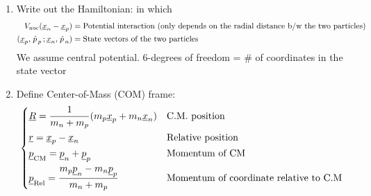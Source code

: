\documentclass{school-22.101-notes}
\begin{document}
\begin{enumerate}
\item Write out the Hamiltonian: 
in which 
\begin{align}
 V_{\mathrm{nuc}} (\underline{x}_n - \underline{x}_p ) &= \mbox{Potential interaction (only depends on the radial distance b/w the two particles)} \\
 (\underline{x}_p, \left. \hat{p} \right._p; \underline{x}_n, \left. \hat{p} \right._n) &= \mbox{State vectors of the two particles} 
\end{align}
We assume central potential. 6-degrees of freedom = \# of coordinates in the state vector

\item Define Center-of-Mass (COM) frame: 
\begin{align}
\begin{dcases*} 
\uline{R} = \frac{1}{m_n + m_p} (m_p \uline{x}_p + m_n \uline{x}_n ) & C.M. position\\
\uline{r} = \uline{x}_p - \uline{x}_n & Relative position \\
\uline{p}_{\mathrm{CM}} = \uline{p}_{n} + \uline{p}_p & Momentum of CM \\
\uline{p}_{\mathrm{Rel}} = \frac{m_p \uline{p}_n - m_n \uline{p}_p}{m_n + m_p} & Momentum of coordinate relative to C.M \\
\end{dcases*}
\end{align}


\end{enumerate}
\end{document}
